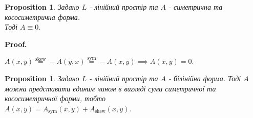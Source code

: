 \documentclass[a4paper, 10pt]{article}
\makeatletter
\theoremstyle{theoremdd}
\newtheorem{proposition}[theorem]{Proposition}
\renewenvironment{proof}[1][Proof.\\]{\par
\pushQED{\hfill \qed}%
\normalfont \topsep6\p@\@plus6\p@\relax
\trivlist
\item\relax
{\bfseries
#1\@addpunct{.}}\hspace\labelsep\ignorespaces
}{%
\popQED\endtrivlist\@endpefalse
}
\makeatother
\begin{document}
\begin{proposition}
Задано $L$ - лінійний простір та $A$ - симетрична та кососиметрична форма.\\
Тоді $A \equiv 0$.
\end{proposition}

\begin{proof}
$A(x,y) \overset{\text{skew}}{=} -A(y,x) \overset{\text{sym}}{=} -A(x,y) \implies A(x,y) = 0$.
\end{proof}

\begin{proposition}
Задано $L$ - лінійний простір та $A$ - білінійна форма. Тоді $A$ можна представити єдиним чином в вигляді суми симетричної та кососиметричної форми, тобто\\
$A(x,y) = A_{\text{sym}}(x,y) + A_{\text{skew}}(x,y)$.
\end{proposition}
\end{document}
